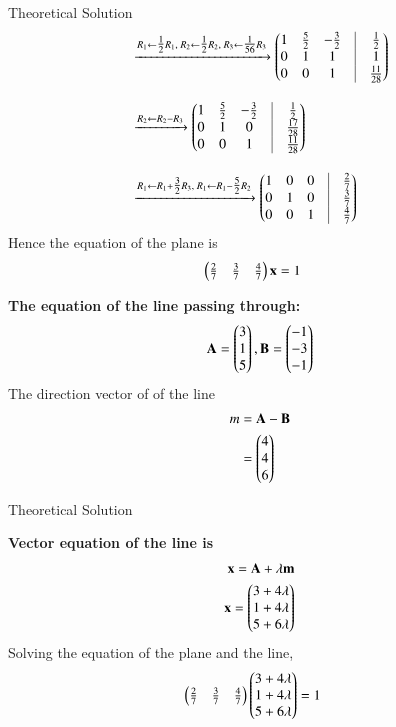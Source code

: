 \documentclass{beamer}
\begin{document}
\begin{frame}{Theoretical Solution }
\begin{align}
&\xrightarrow{R_1 \leftarrow \tfrac{1}{2}R_1,\; R_2 \leftarrow \tfrac{1}{2}R_2,\; R_3 \leftarrow \tfrac{1}{56}R_3}
\myvec{1 & \tfrac{5}{2} & -\tfrac{3}{2} & \vline & \tfrac{1}{2} \\
0 & 1 & 1 & \vline & 1 \\
0 & 0 & 1 & \vline & \tfrac{11}{28}
}\nonumber
\\[1em]
&\xrightarrow{R_2 \leftarrow R_2 - R_3}
\myvec{1 & \tfrac{5}{2} & -\tfrac{3}{2} & \vline & \tfrac{1}{2} \\
0 & 1 & 0 & \vline & \tfrac{17}{28} \\
0 & 0 & 1 & \vline & \tfrac{11}{28}}\nonumber
\\[1em]
&\xrightarrow{R_1 \leftarrow R_1 + \tfrac{3}{2}R_3,\; R_1 \leftarrow R_1 - \tfrac{5}{2}R_2}
\myvec{1 & 0 & 0 & \vline & \tfrac{2}{7} \\
0 & 1 & 0 & \vline & \tfrac{3}{7} \\
0 & 0 & 1 & \vline & \tfrac{4}{7}}\nonumber
\end{align}
Hence the equation of the plane is 
\begin{align} 
\begin{pmatrix}\tfrac{2}{7}&\tfrac{3}{7} &\tfrac{4}{7}\end{pmatrix}\mathbf{x}&=1
\end{align}

\textbf{The equation of the line passing through:}\\
\begin{align}
\mathbf{A}=\begin{pmatrix}3\\1\\5\end{pmatrix},\mathbf{B}=\begin{pmatrix}-1\\-3\\-1\end{pmatrix}\\
\end{align}
The direction vector of of the line
\begin{align}
m&=\mathbf{A}-\mathbf{B}\\
&=\begin{pmatrix}4\\4\\6\end{pmatrix}
\end{align}
\end{frame}
\begin{frame}{Theoretical Solution }

\textbf{Vector equation of the line is}
\begin{align}
\mathbf{x}=\mathbf{A}+\lambda\mathbf{m}\\\nonumber
\mathbf{x}=\begin{pmatrix}3+4\lambda\\1+4\lambda\\5+6\lambda\end{pmatrix}
\end{align}
Solving the equation of the plane and the line,\\
\begin{align}
\begin{pmatrix}\tfrac{2}{7}&\tfrac{3}{7} &\tfrac{4}{7}\end{pmatrix}\begin{pmatrix}3+4\lambda\\1+4\lambda\\5+6\lambda\end{pmatrix}&=1
\end{align}
\end{frame}
\end{document}
